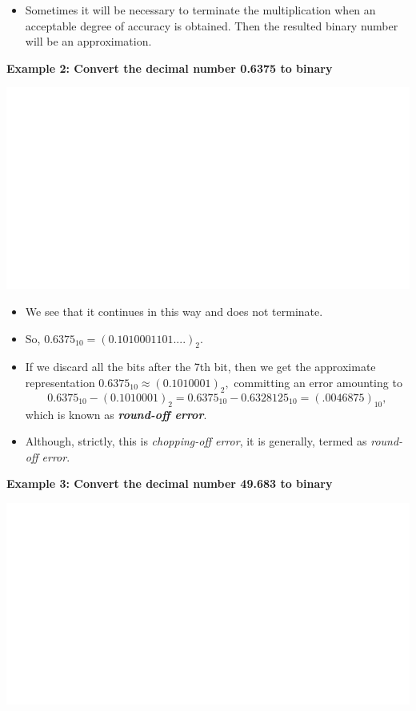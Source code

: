 \documentclass[]{book}
\providecommand{\tightlist}{%
  \setlength{\itemsep}{0pt}\setlength{\parskip}{0pt}}
\begin{document}
\begin{itemize}
\tightlist
\item
  Sometimes it will be necessary to terminate the multiplication when an acceptable degree of accuracy is obtained. Then the resulted binary number will be an approximation.
\end{itemize}

\textbf{Example 2: Convert the decimal number 0.6375 to binary}

\begin{center}\includegraphics[width=1\linewidth]{figure/NSbox7-1} \end{center}

\begin{itemize}
\item
  We see that it continues in this way and does not terminate.
\item
  So, \(0.6375_{10} = (0.1010001101....)_{2}\).
\item
  If we discard all the bits after the 7th bit, then we get the approximate representation \(0.6375_{10} \approx (0.1010001)_{2},\) committing an error amounting to
  \[0.6375_{10} -(0.1010001)_{2}= 0.6375_{10} -0.6328125_{10}= (.0046875)_{10},\]
  which is known as \textbf{\emph{round-off error}}.
\item
  Although, strictly, this is \emph{chopping-off error}, it is generally, termed as \emph{round-off error}.
\end{itemize}

\textbf{Example 3: Convert the decimal number 49.683 to binary}

\begin{center}\includegraphics[width=1\linewidth]{figure/NSbox8-1} \end{center}
\end{document}
